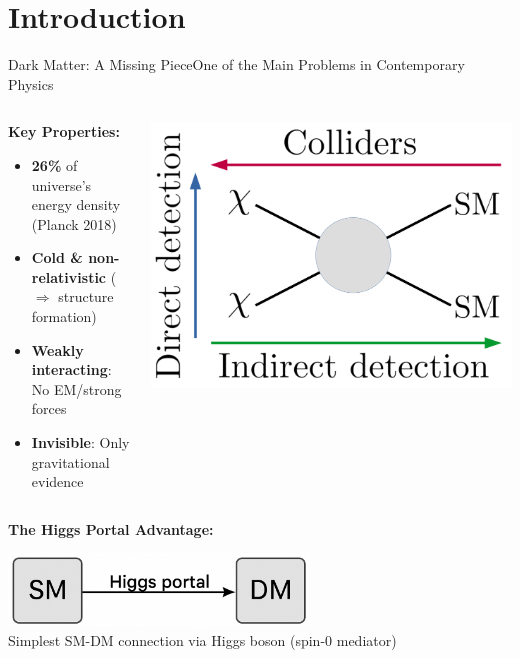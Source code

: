 \documentclass{../../bredelebeamer}
\begin{document}
\section{Introduction}
\begin{frame}{Dark Matter: A Missing Piece}{One of the Main Problems in 
Contemporary Physics}
    
    \begin{columns}[T]
        \begin{column}{0.53\textwidth}
            \textbf{Key Properties:}
            \begin{itemize}
                \item \textbf{26\%} of universe's energy density (Planck 2018)
                \item \textbf{Cold \& non-relativistic} ($\Rightarrow$ structure formation)
                \item \textbf{Weakly interacting}: No EM/strong forces
                \item \textbf{Invisible}: Only gravitational evidence
            \end{itemize}
        \end{column}
        \begin{column}{0.45\textwidth}
            \includegraphics[width=\textwidth]{../Images/schematic_DMdetections.png}
        \end{column}
    \end{columns}

    \vspace{0.5cm}
    \pause

    \textbf{The Higgs Portal Advantage:}
    \begin{center}
        \includegraphics[width=0.6\textwidth]{../Images/Higgs_portal.png} \\
        \footnotesize Simplest SM-DM connection via Higgs boson (spin-0 mediator)
    \end{center}
\end{frame}
\end{document}
